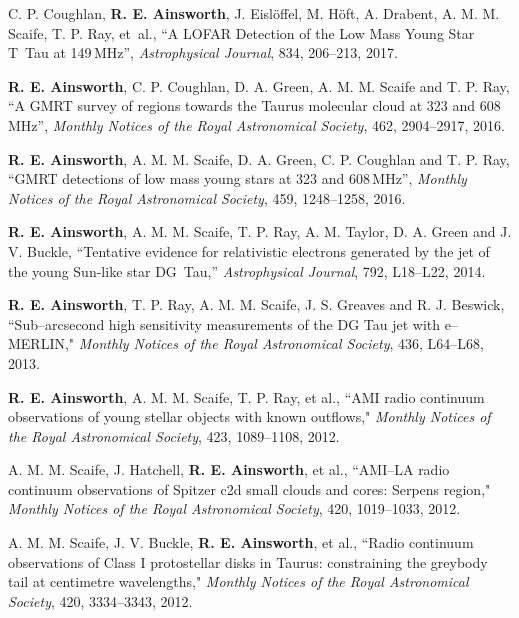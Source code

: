 \begin{cvpubs}
  \cvpub
    {
      \begin{cvetar}
        \item {C. P. Coughlan, \textbf{R. E. Ainsworth}, J. Eisl{\"o}ffel, M. H{\"o}ft, A. Drabent, A. M. M. Scaife, T. P. Ray, et~al., ``A LOFAR Detection of the Low Mass Young Star T~Tau at 149\,MHz'', \textit{Astrophysical Journal}, 834, 206--213, 2017.}
        \item {\textbf{R. E. Ainsworth}, C. P. Coughlan, D. A. Green, A. M. M. Scaife and T. P. Ray, ``A GMRT survey of regions towards the Taurus molecular cloud at 323 and 608\,MHz'', \textit{Monthly Notices of the Royal Astronomical Society}, 462, 2904--2917, 2016.}
\item {\textbf{R. E. Ainsworth}, A. M. M. Scaife, D. A. Green, C. P. Coughlan and T. P. Ray, ``GMRT detections of low mass young stars at 323 and 608\,MHz'', \textit{Monthly Notices of the Royal Astronomical Society}, 459, 1248--1258, 2016.}
\item {\textbf{R. E. Ainsworth}, A. M. M. Scaife, T. P. Ray, A. M. Taylor, D. A. Green and J. V. Buckle, ``Tentative evidence for relativistic electrons generated by the jet of the young Sun-like star DG~Tau,'' \textit{Astrophysical Journal}, 792, L18--L22, 2014.}
\item {\textbf{R. E. Ainsworth}, T. P. Ray, A. M. M. Scaife, J. S. Greaves and R. J. Beswick, ``Sub--arcsecond high sensitivity measurements of the DG Tau jet with e--MERLIN," \textit{Monthly Notices of the Royal Astronomical Society}, 436, L64--L68, 2013.}
\item {\textbf{R. E. Ainsworth}, A. M. M. Scaife, T. P. Ray, et al., ``AMI radio continuum observations of young stellar objects with known outflows," \textit{Monthly Notices of the Royal Astronomical Society}, 423, 1089--1108, 2012.}
\item {A. M. M. Scaife, J. Hatchell, \textbf{R. E. Ainsworth}, et al., ``AMI--LA radio continuum observations of Spitzer c2d small clouds and cores: Serpens region," \textit{Monthly Notices of the Royal Astronomical Society}, 420, 1019--1033, 2012.}
\item {A. M. M. Scaife, J. V. Buckle, \textbf{R. E. Ainsworth}, et al., ``Radio continuum observations of Class I protostellar disks in Taurus: constraining the greybody tail at centimetre wavelengths," \textit{Monthly Notices of the Royal Astronomical Society}, 420, 3334--3343, 2012.}
      \end{cvetar}
    }
\end{cvpubs}

